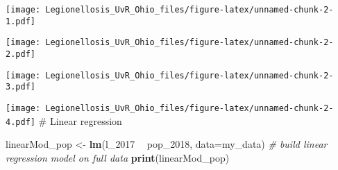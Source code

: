 \documentclass[]{article}
\newenvironment{Shaded}{\begin{snugshade}}{\end{snugshade}}
\newcommand{\CommentTok}[1]{\textcolor[rgb]{0.56,0.35,0.01}{\textit{#1}}}
\newcommand{\DataTypeTok}[1]{\textcolor[rgb]{0.13,0.29,0.53}{#1}}
\newcommand{\DecValTok}[1]{\textcolor[rgb]{0.00,0.00,0.81}{#1}}
\newcommand{\KeywordTok}[1]{\textcolor[rgb]{0.13,0.29,0.53}{\textbf{#1}}}
\newcommand{\NormalTok}[1]{#1}
\newcommand{\OperatorTok}[1]{\textcolor[rgb]{0.81,0.36,0.00}{\textbf{#1}}}
\newcommand{\StringTok}[1]{\textcolor[rgb]{0.31,0.60,0.02}{#1}}
\begin{document}
\texttt{[image: Legionellosis\_UvR\_Ohio\_files/figure-latex/unnamed-chunk-2-1.pdf]}

\begin{Shaded}
\end{Shaded}

\texttt{[image: Legionellosis\_UvR\_Ohio\_files/figure-latex/unnamed-chunk-2-2.pdf]}

\begin{Shaded}
\end{Shaded}

\texttt{[image: Legionellosis\_UvR\_Ohio\_files/figure-latex/unnamed-chunk-2-3.pdf]}

\begin{Shaded}
\end{Shaded}

\texttt{[image: Legionellosis\_UvR\_Ohio\_files/figure-latex/unnamed-chunk-2-4.pdf]}
\# Linear regression

\begin{Shaded}
\begin{Highlighting}[]
\NormalTok{linearMod_pop <-}\StringTok{ }\KeywordTok{lm}\NormalTok{(l_}\DecValTok{2017} \OperatorTok{~}\StringTok{ }\NormalTok{pop_}\DecValTok{2018}\NormalTok{, }\DataTypeTok{data=}\NormalTok{my_data)  }\CommentTok{# build linear regression model on full data}
\KeywordTok{print}\NormalTok{(linearMod_pop)}
\end{Highlighting}
\end{Shaded}
\end{document}
